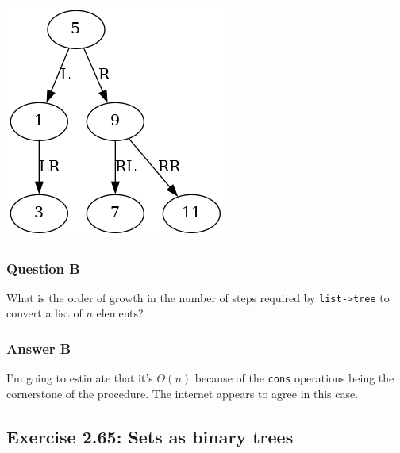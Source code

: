 \documentclass[final,fleqn,titlepage,twoside]{article}
\begin{document}
\begin{center}
\includegraphics[width=.9\linewidth]{2/fig/Ex64.png}
\end{center}

\subsubsection{Question B}
\label{sec:orga9ead36}
What is the order of growth in the number of steps required by
\texttt{list->tree} to convert a list of \(n\) elements?

\subsubsection{Answer B}
\label{sec:org1cc63d3}
I'm going to estimate that it's \(\Theta(n)\) because of the \texttt{cons}
operations being the cornerstone of the procedure. The internet appears to agree
in this case.

\subsection{Exercise 2.65: Sets as binary trees}
\label{sec:orga67bac8}
\end{document}
